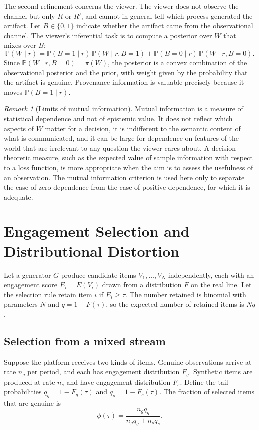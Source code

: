 \documentclass[12pt]{article}
\theoremstyle{plain}
\theoremstyle{definition}
\theoremstyle{remark}
\newtheorem{remark}{Remark}
\renewcommand{\Pr}{\mathbb{P}}
\begin{document}
The second refinement concerns the viewer. The viewer does not observe the channel but only $R$ or $R'$, and cannot in general tell which process generated the artifact. Let $B \in \{0, 1\}$ indicate whether the artifact came from the observational channel. The viewer's inferential task is to compute a posterior over $W$ that mixes over $B$:
\[
\Pr(W \mid r) = \Pr(B{=}1 \mid r)\,\Pr(W \mid r, B{=}1) + \Pr(B{=}0 \mid r)\,\Pr(W \mid r, B{=}0).
\]
Since $\Pr(W \mid r, B{=}0) = \pi(W)$, the posterior is a convex combination of the observational posterior and the prior, with weight given by the probability that the artifact is genuine. Provenance information is valuable precisely because it moves $\Pr(B{=}1 \mid r)$.

\begin{remark}[Limits of mutual information]
Mutual information is a measure of statistical dependence and not of epistemic value. It does not reflect which aspects of $W$ matter for a decision, it is indifferent to the semantic content of what is communicated, and it can be large for dependence on features of the world that are irrelevant to any question the viewer cares about. A decision-theoretic measure, such as the expected value of sample information with respect to a loss function, is more appropriate when the aim is to assess the usefulness of an observation. The mutual information criterion is used here only to separate the case of zero dependence from the case of positive dependence, for which it is adequate.
\end{remark}

\section{Engagement Selection and Distributional Distortion}

Let a generator $G$ produce candidate items $V_1, \dots, V_N$ independently, each with an engagement score $E_i = E(V_i)$ drawn from a distribution $F$ on the real line. Let the selection rule retain item $i$ if $E_i \ge \tau$. The number retained is binomial with parameters $N$ and $q = 1 - F(\tau)$, so the expected number of retained items is $Nq$.

\subsection*{Selection from a mixed stream}

Suppose the platform receives two kinds of items. Genuine observations arrive at rate $n_g$ per period, and each has engagement distribution $F_g$. Synthetic items are produced at rate $n_s$ and have engagement distribution $F_s$. Define the tail probabilities $q_g = 1 - F_g(\tau)$ and $q_s = 1 - F_s(\tau)$. The fraction of selected items that are genuine is
\[
\phi(\tau) = \frac{n_g q_g}{n_g q_g + n_s q_s}.
\]
\end{document}
